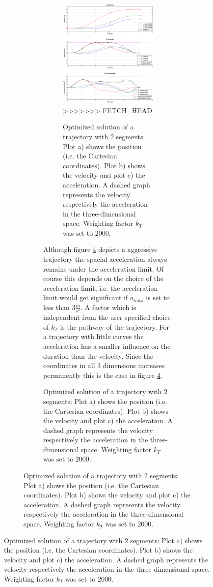 \begin{figure}[h]
\begin{figure}[H]
\begin{figure}[H]
\begin{figure}[H]
   \centering
   \includegraphics[trim = 35mm 23mm 30mm 40mm,width=1\textwidth]{pics/2SegOpti5s16k2000.eps}
>>>>>>> FETCH_HEAD
   \caption{Optimized solution of a trajectory with 2 segments: Plot a) shows the position (i.e. the Cartesian coordinates). Plot b) shows the velocity and plot c) the acceleration. A dashed graph represents the velocity respectively the acceleration in the three-dimensional space. Weighting factor $k_T$ was set to 2000.}
   \label{pic:optimizedSolution2k2000}
\end{figure}


Although figure \ref{pic:optimizedSolution2k2000} depicts a aggressive trajectory the spacial acceleration always remains under the acceleration limit. Of course this depends on the choice of the acceleration limit, i.e. the acceleration limit would get significant if $a_{max}$ is set to less than $3 \frac{m}{s^2}$.
A factor which is independent from the user specified choice of $k_T$ is the pathway of the trajectory. For a trajectory with little curves the acceleration has a smaller influence on the duration than the velocity. Since the coordinates in all 3 dimensions increases permanently this is the case in figure \ref{pic:optimizedSolution2k2000}. \newline




\end{figure}
\end{figure}
\end{figure}
